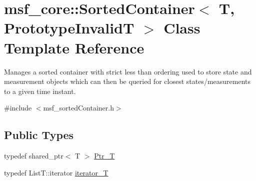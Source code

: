 \hypertarget{classmsf__core_1_1SortedContainer}{\section{msf\-\_\-core\-:\-:Sorted\-Container$<$ T, Prototype\-Invalid\-T $>$ Class Template Reference}
\label{classmsf__core_1_1SortedContainer}
}


Manages a sorted container with strict less than ordering used to store state and measurement objects which can then be queried for closest states/measurements to a given time instant.  




{\ttfamily \#include $<$msf\-\_\-sorted\-Container.\-h$>$}

\subsection*{Public Types}
\begin{DoxyCompactItemize}
\item 
typedef shared\-\_\-ptr$<$ T $>$ \hyperlink{classmsf__core_1_1SortedContainer_a0dd7e9676bf540e11f526a8ac16da06b}{Ptr\-\_\-\-T}
\item 
typedef List\-T\-::iterator \hyperlink{classmsf__core_1_1SortedContainer_ac060dafe3a40d73ef6d35f4be7e0213e}{iterator\-\_\-\-T}
\end{DoxyCompactItemize}
